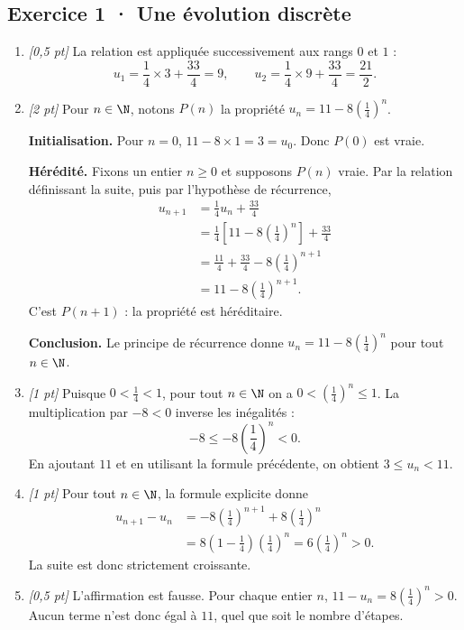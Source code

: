 \subsection*{Exercice 1 · Une évolution discrète}\begin{enumerate}

\item \textit{[0,5 pt]} La relation est appliquée successivement aux rangs $0$ et $1$ :\[u_1=\frac{1}{4}\times 3+\frac{33}{4}=9,\qquad u_2=\frac{1}{4}\times 9+\frac{33}{4}=\frac{21}{2}.\]

\item \textit{[2 pt]} Pour $n\in\N$, notons $P(n)$ la propriété $u_n=11-8\left(\frac{1}{4}\right)^n$.
\par\smallskip\textbf{Initialisation.} Pour $n=0$, $11-8\times1=3=u_0$. Donc $P(0)$ est vraie.
\par\smallskip\textbf{Hérédité.} Fixons un entier $n\ge0$ et supposons $P(n)$ vraie. Par la relation définissant la suite, puis par l'hypothèse de récurrence,
\[\begin{aligned}u_{n+1}&=\frac{1}{4}u_n+\frac{33}{4}\\
&=\frac{1}{4}\left[11-8\left(\frac{1}{4}\right)^n\right]+\frac{33}{4}\\
&=\frac{11}{4}+\frac{33}{4}-8\left(\frac{1}{4}\right)^{n+1}\\
&=11-8\left(\frac{1}{4}\right)^{n+1}.
\end{aligned}\]
C'est $P(n+1)$ : la propriété est héréditaire.
\par\smallskip\textbf{Conclusion.} Le principe de récurrence donne $u_n=11-8\left(\frac{1}{4}\right)^n$ pour tout $n\in\N$.

\item \textit{[1 pt]} Puisque $0<\frac{1}{4}<1$, pour tout $n\in\N$ on a $0<(\frac{1}{4})^n\le1$. La multiplication par $-8<0$ inverse les inégalités :
\[-8\le-8(\frac{1}{4})^n<0.\]
En ajoutant $11$ et en utilisant la formule précédente, on obtient $3\le u_n<11$.

\item \textit{[1 pt]} Pour tout $n\in\N$, la formule explicite donne
\[\begin{aligned}u_{n+1}-u_n&=-8(\frac{1}{4})^{n+1}+8(\frac{1}{4})^n\\&=8(1-\frac{1}{4})(\frac{1}{4})^n=6(\frac{1}{4})^n>0.\end{aligned}\]
La suite est donc strictement croissante.

\item \textit{[0,5 pt]} L'affirmation est fausse. Pour chaque entier $n$, $11-u_n=8(\frac{1}{4})^n>0$. Aucun terme n'est donc égal à $11$, quel que soit le nombre d'étapes.

\end{enumerate}

